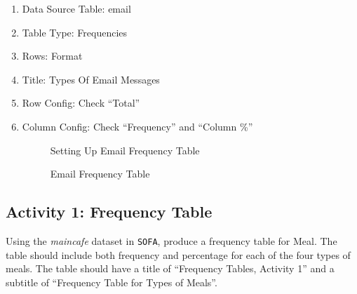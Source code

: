 \begin{enumerate}
  \item Data Source Table: email
  \item Table Type: Frequencies
  \item Rows: Format
  \item Title: Types Of Email Messages
  \item Row Config: Check ``Total''
  \item Column Config: Check ``Frequency'' and ``Column \%''
  
  \begin{figure}[H]
    \begin{center}
      \caption{Setting Up Email Frequency Table}
    \end{center}
  \end{figure}

  \begin{figure}[H]
    \begin{center}
      \caption{Email Frequency Table}
    \end{center}
  \end{figure}

\end{enumerate}

\subsection{Activity 1: Frequency Table} \label{fre:act01}

Using the \textit{maincafe} dataset in \texttt{SOFA}, produce a frequency table for Meal. The table should include both frequency and percentage for each of the four types of meals. The table should have a title of ``Frequency Tables, Activity 1'' and a subtitle of ``Frequency Table for Types of Meals''.

